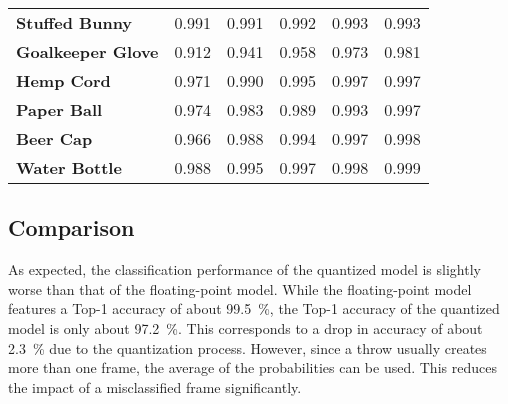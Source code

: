 \begin{table}
\begin{tabular}{llllll}
    \textbf{Stuffed Bunny} & \num{0.991} & \num{0.991} & \num{0.992} & \num{0.993} & \num{0.993} \\
    \textbf{Goalkeeper Glove} & \num{0.912} & \num{0.941} & \num{0.958} & \num{0.973} & \num{0.981} \\
    \textbf{Hemp Cord} & \num{0.971} & \num{0.990} & \num{0.995} & \num{0.997} & \num{0.997} \\
    \textbf{Paper Ball} & \num{0.974} & \num{0.983} & \num{0.989} & \num{0.993} & \num{0.997} \\
    \textbf{Beer Cap} & \num{0.966} & \num{0.988} & \num{0.994} & \num{0.997} & \num{0.998} \\
    \textbf{Water Bottle} & \num{0.988} & \num{0.995} & \num{0.997} & \num{0.998} & \num{0.999} \\
    \bottomrule
  \end{tabular}
\end{table}

\subsection{Comparison}
\label{subsec:verification_and_benchmark:classification_performance:comparison}

As expected, the classification performance of the quantized model is slightly worse than that of the floating-point model.
While the floating-point model features a Top-1 accuracy of about \SI{99.5}{\percent}, the Top-1 accuracy of the quantized model is only about \SI{97.2}{\percent}.
This corresponds to a drop in accuracy of about \SI{2.3}{\percent} due to the quantization process.
However, since a throw usually creates more than one frame, the average of the probabilities can be used.
This reduces the impact of a misclassified frame significantly.

